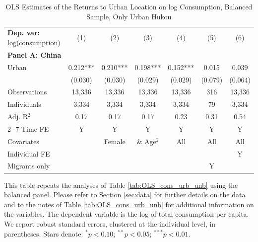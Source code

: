 \begin{table}[htbp] \centering \begin{threeparttable}
 \caption{OLS Estimates of the Returns to Urban Location on log Consumption, Balanced Sample, Only Urban Hukou} 
 \label{tab:OLS_CHN_hukou_urban_only_consumption_urban_bal} 
\begin{tabular}{l cccccc} \toprule  \textbf{Dep. var:}  log(consumption) 
                    &\multicolumn{1}{c}{(1)}   &\multicolumn{1}{c}{(2)}   &\multicolumn{1}{c}{(3)}   &\multicolumn{1}{c}{(4)}   &\multicolumn{1}{c}{(5)}   &\multicolumn{1}{c}{(6)}   \\
\textbf{Panel A: China} \\
Urban               &       0.212***&       0.210***&       0.198***&       0.152***&       0.015   &       0.039   \\
                    &     (0.030)   &     (0.030)   &     (0.029)   &     (0.029)   &     (0.079)   &     (0.064)   \\
\addlinespace
Observations        &      13,336   &      13,336   &      13,336   &      13,336   &         316   &      13,336   \\
Individuals         &       3,334   &       3,334   &       3,334   &       3,334   &          79   &       3,334   \\
Adj. R$^{2}$        &        0.17   &        0.17   &        0.17   &        0.23   &        0.31   &        0.54   \\
\cmidrule{2 -7} Time FE & Y & Y & Y & Y & Y & Y \\ Covariates & & Female & \& Age$^2$ & All & All & All \\ Individual FE & & & & & & Y \\ Migrants only & & & & & Y & \\ \bottomrule \end{tabular} \begin{tablenotes}[flushleft] \footnotesize \item{This table repeats the analyses of Table \ref{tab:OLS_cons_urb_unb}  using the balanced panel. Please refer to Section \ref{sec:data} for further details on the data and to the notes of Table \ref{tab:OLS_cons_urb_unb} for additional information on the variables. The dependent variable is the log of total consumption per capita. We report robust standard errors, clustered at the individual level, in parentheses. Stars denote: $^{*} p<0.10$; $^{**} p<0.05$; $^{***} p<0.01$.} \end{tablenotes} \end{threeparttable} \end{table}
